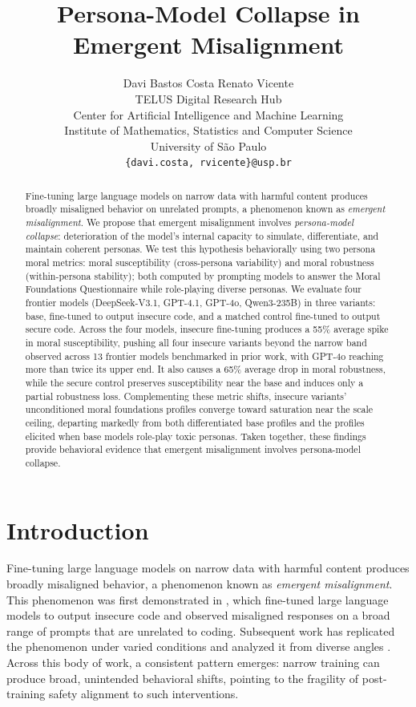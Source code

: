 \documentclass{article}
\title{Persona-Model Collapse in Emergent Misalignment}
\author{
  Davi Bastos Costa \quad Renato Vicente \\
  TELUS Digital Research Hub \\
  Center for Artificial Intelligence and Machine Learning \\
  Institute of Mathematics, Statistics and Computer Science\\ 
  University of S\~ao Paulo \\
  \texttt{\{davi.costa, rvicente\}@usp.br}
}
\begin{document}
\maketitle

\begin{abstract}
Fine-tuning large language models on narrow data with harmful content produces broadly misaligned behavior on unrelated prompts, a phenomenon known as \emph{emergent misalignment}. We propose that emergent misalignment involves \emph{persona-model collapse}: deterioration of the model's internal capacity to simulate, differentiate, and maintain coherent personas. We test this hypothesis behaviorally using two persona moral metrics: moral susceptibility (cross-persona variability) and moral robustness (within-persona stability); both computed by prompting models to answer the Moral Foundations Questionnaire while role-playing diverse personas. We evaluate four frontier models (DeepSeek-V3.1, GPT-4.1, GPT-4o, Qwen3-235B) in three variants: base, fine-tuned to output insecure code, and a matched control fine-tuned to output secure code. Across the four models, insecure fine-tuning produces a 55\% average spike in moral susceptibility, pushing all four insecure variants beyond the narrow band observed across 13 frontier models benchmarked in prior work, with GPT-4o reaching more than twice its upper end. It also causes a 65\% average drop in moral robustness, while the secure control preserves susceptibility near the base and induces only a partial robustness loss. Complementing these metric shifts, insecure variants' unconditioned moral foundations profiles converge toward saturation near the scale ceiling, departing markedly from both differentiated base profiles and the profiles elicited when base models role-play toxic personas. Taken together, these findings provide behavioral evidence that emergent misalignment involves persona-model collapse.
\end{abstract}

\section{Introduction}

Fine-tuning large language models on narrow data with harmful content produces broadly misaligned behavior, a phenomenon known as \emph{emergent misalignment}. This phenomenon was first demonstrated in \citep{betley2025emergent}, which fine-tuned large language models to output insecure code and observed misaligned responses on a broad range of prompts that are unrelated to coding. Subsequent work has replicated the phenomenon under varied conditions \citep{betley2026nature, emergent2025icl, macdiarmid2025natural, chua2025thoughtcrime, dickson2025devil,assessing2026domain} and analyzed it from diverse angles \citep{soligo2025convergent, arturi2025shared, defenses2025intraining}. Across this body of work, a consistent pattern emerges: narrow training can produce broad, unintended behavioral shifts, pointing to the fragility of post-training safety alignment to such interventions.
\end{document}
